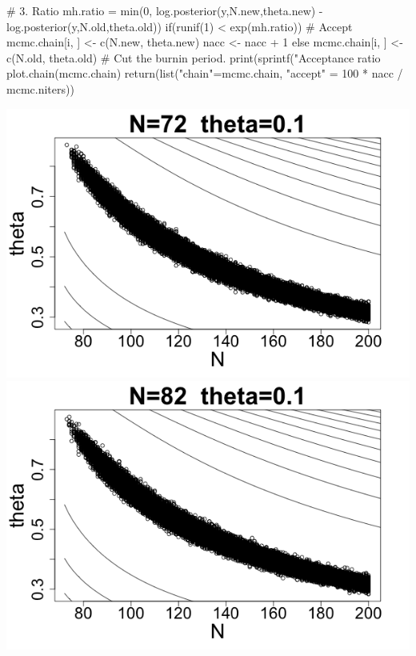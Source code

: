 \documentclass[letterpaper,10pt]{amsart}
\newenvironment{verbatimcode}{\bigskip \scriptsize \verbatim}{\endverbatim \normalsize \bigskip}
\begin{document}
\begin{enumerate}[{1}.1]
\begin{verbatimcode}
{{    # 3. Ratio
    mh.ratio = min(0, log.posterior(y,N.new,theta.new) - 
                     log.posterior(y,N.old,theta.old))
    if(runif(1) < exp(mh.ratio)) {
      # Accept 
      mcmc.chain[i, ] <- c(N.new, theta.new)
      nacc <- nacc + 1
    } else {
      mcmc.chain[i, ] <- c(N.old, theta.old)
    }
  }
  # Cut the burnin period.
  print(sprintf("Acceptance ratio %
  plot.chain(mcmc.chain)
  return(list("chain"=mcmc.chain, "accept" = 100 * nacc / mcmc.niters))
}
\end{verbatimcode}

\begin{center}
\includegraphics[scale=0.25]{Stat221Waterbuck1.png}
\includegraphics[scale=0.25]{Stat221Waterbuck6.png}
\end{center}
\begin{center}

\end{center}
\end{enumerate}
\end{document}

